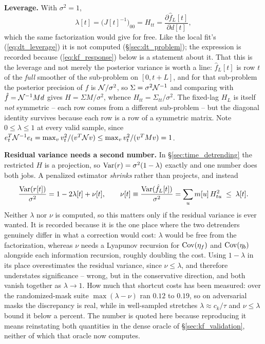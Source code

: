 \documentclass{article}
\numberwithin{equation}{section}   %
\begin{document}
{\bf Leverage.}  With $\sigma^2 = 1$,
\begin{equation}
\lambda[t] = \big(J[t]^{-1}\big)_{00} = H_{tt} = \frac{\partial \hat f_L[t]}{\partial d[t]} ,
\label{eq:kf_leverage}
\end{equation}
which the same factorization would give for free.  Like the local fit's (\ref{eq:dt_leverage}) it is not
computed (\S\ref{sec:dt_problem}); the expression is recorded because (\ref{eq:kf_response}) below is a
statement about it.  That this is the leverage and not merely the posterior variance is worth a line:
$\hat f_L[t]$ is row $t$ of the {\em full} smoother of the sub-problem on $[0,t+L]$, and for that
sub-problem the posterior precision of $f$ is ${\cal N}/\sigma^2$, so $\Sigma = \sigma^2{\cal N}^{-1}$ and
comparing with $\hat f = {\cal N}^{-1}Md$ gives $H = \Sigma M/\sigma^2$, whence $H_{tt} = \Sigma_{tt}/\sigma^2$.
The fixed-lag $H_L$ is itself {\em not} symmetric -- each row comes from a different sub-problem -- but the
diagonal identity survives because each row is a row of a symmetric matrix.  Note $0 \le \lambda \le 1$ at
every valid sample, since
$e_t^T{\cal N}^{-1}e_t = \max_v v_t^2/(v^T{\cal N}v) \le \max_v v_t^2/(v^TMv) = 1$.

{\bf Residual variance needs a second number.}  In \S\ref{sec:time_detrending} the restricted $H$ is a
projection, so ${\rm Var}(r) = \sigma^2(1-\lambda)$ exactly and one number does both jobs.  A penalized
estimator {\em shrinks} rather than projects, and instead
\begin{equation}
\frac{{\rm Var}(r[t])}{\sigma^2} = 1 - 2\lambda[t] + \nu[t] , \qquad
\nu[t] \equiv \frac{{\rm Var}(\hat f_L[t])}{\sigma^2} = \sum_u m[u]\,H_{tu}^2 \;\le\; \lambda[t] .
\label{eq:kf_var_r}
\end{equation}
Neither $\lambda$ nor $\nu$ is computed, so this matters only if the residual variance is ever wanted.  It is
recorded because it is the one place where the two detrenders genuinely differ in what a correction would
cost: $\lambda$ would be free from the factorization, whereas $\nu$ needs a Lyapunov recursion for
${\rm Cov}(\eta_f)$ and ${\rm Cov}(\eta_b)$ alongside each information recursion, roughly doubling the cost.
Using $1-\lambda$ in its place overestimates the residual variance, since $\nu \le \lambda$, and therefore
understates significance -- wrong, but in the conservative direction, and both vanish together as
$\lambda \rightarrow 1$.  How much that shortcut costs has been measured: over the randomized-mask suite
$\max(\lambda - \nu)$ ran $0.12$ to $0.19$, so on adversarial masks the discrepancy is real, while in
well-sampled stretches $\lambda \approx c_k/\tau$ and $\nu \le \lambda$ bound it below a percent.  The number
is quoted here because reproducing it means reinstating both quantities in the dense oracle of
\S\ref{sec:kf_validation}, neither of which that oracle now computes.
\end{document}

